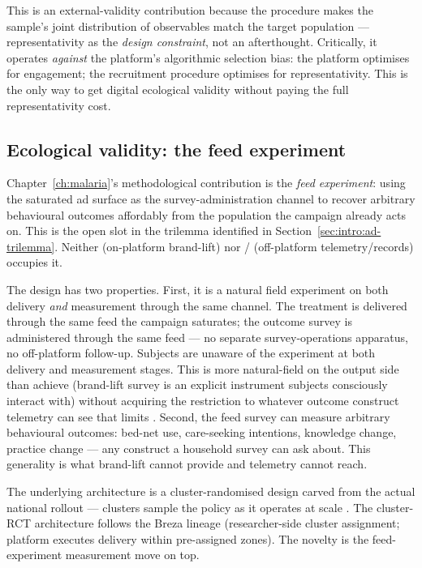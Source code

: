 This is an external-validity contribution because the procedure makes the sample's joint distribution of observables match the target population --- representativity as the \emph{design constraint}, not an afterthought. Critically, it operates \emph{against} the platform's algorithmic selection bias: the platform optimises for engagement; the recruitment procedure optimises for representativity. This is the only way to get digital ecological validity without paying the full representativity cost.

\subsection{Ecological validity: the feed experiment}
\label{sec:intro:ch2}

Chapter~\ref{ch:malaria}'s methodological contribution is the \emph{feed experiment}: using the saturated ad surface as the survey-administration channel to recover arbitrary behavioural outcomes affordably from the population the campaign already acts on. This is the open slot in the trilemma identified in Section~\ref{sec:intro:ad-trilemma}. Neither \citet{Athey2023} (on-platform brand-lift) nor \citet{Breza2021}/\citet{Ho2023} (off-platform telemetry/records) occupies it.

The design has two properties. First, it is a natural field experiment on both delivery \emph{and} measurement through the same channel. The treatment is delivered through the same feed the campaign saturates; the outcome survey is administered through the same feed --- no separate survey-operations apparatus, no off-platform follow-up. Subjects are unaware of the experiment at both delivery and measurement stages. This is more natural-field on the output side than \citet{Athey2023} achieve (brand-lift survey is an explicit instrument subjects consciously interact with) without acquiring the restriction to whatever outcome construct telemetry can see that limits \citet{Breza2021}. Second, the feed survey can measure arbitrary behavioural outcomes: bed-net use, care-seeking intentions, knowledge change, practice change --- any construct a household survey can ask about. This generality is what brand-lift cannot provide and telemetry cannot reach.

The underlying architecture is a cluster-randomised design carved from the actual national rollout --- clusters sample the policy as it operates at scale \citep{Hayes2017}. The cluster-RCT architecture follows the Breza lineage (researcher-side cluster assignment; platform executes delivery within pre-assigned zones). The novelty is the feed-experiment measurement move on top.

